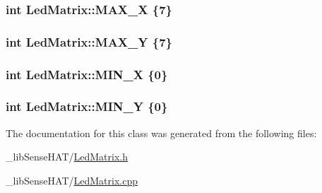 \subsubsection[{\texorpdfstring{M\+A\+X\+\_\+X}{MAX_X}}]{ int Led\+Matrix\+::\+M\+A\+X\+\_\+X \{7\}\hspace{0.3cm}{\ttfamily [static]}}\hypertarget{class_led_matrix_a6da341535a246a5395b0a46569618830}{}\label{class_led_matrix_a6da341535a246a5395b0a46569618830}
\subsubsection[{\texorpdfstring{M\+A\+X\+\_\+Y}{MAX_Y}}]{ int Led\+Matrix\+::\+M\+A\+X\+\_\+Y \{7\}\hspace{0.3cm}{\ttfamily [static]}}\hypertarget{class_led_matrix_aa6cf03e172a1efe233aaac293be202bd}{}\label{class_led_matrix_aa6cf03e172a1efe233aaac293be202bd}
\subsubsection[{\texorpdfstring{M\+I\+N\+\_\+X}{MIN_X}}]{ int Led\+Matrix\+::\+M\+I\+N\+\_\+X \{0\}\hspace{0.3cm}{\ttfamily [static]}}\hypertarget{class_led_matrix_a30e3af90d4c9a83aec44e71914f86aa3}{}\label{class_led_matrix_a30e3af90d4c9a83aec44e71914f86aa3}
\subsubsection[{\texorpdfstring{M\+I\+N\+\_\+Y}{MIN_Y}}]{ int Led\+Matrix\+::\+M\+I\+N\+\_\+Y \{0\}\hspace{0.3cm}{\ttfamily [static]}}\hypertarget{class_led_matrix_a4bb052cfec297bc54387decb20a0f17f}{}\label{class_led_matrix_a4bb052cfec297bc54387decb20a0f17f}


The documentation for this class was generated from the following files\+:\begin{DoxyCompactItemize}
\item 
\+\_\+lib\+Sense\+H\+A\+T/\hyperlink{_led_matrix_8h}{Led\+Matrix.\+h}\item 
\+\_\+lib\+Sense\+H\+A\+T/\hyperlink{_led_matrix_8cpp}{Led\+Matrix.\+cpp}\end{DoxyCompactItemize}
